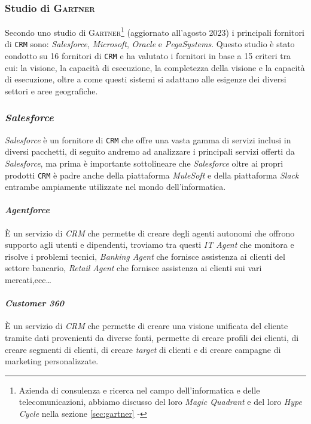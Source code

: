 {{    \subsubsection{Studio di \textsc{Gartner}}
        Secondo uno studio di \textsc{Gartner}\footnote{
            Azienda di consulenza e ricerca nel campo dell'informatica e delle telecomunicazioni, abbiamo discusso del loro \textit{Magic Quadrant} e del loro \textit{Hype Cycle} nella sezione \ref{sec:gartner} - 
        } (aggiornato all'agosto 2023) i principali fornitori di \texttt{CRM} sono: \textit{Salesforce}, \textit{Microsoft}, \textit{Oracle} e \textit{PegaSystems}. Questo studio è stato condotto su 16 fornitori di \texttt{CRM} e ha valutato i fornitori in base a 15 criteri tra cui: la visione, la capacità di esecuzione, la completezza della visione e la capacità di esecuzione, oltre a come questi sistemi si adattano alle esigenze dei diversi settori e aree geografiche.
    \subsubsection{\textit{Salesforce}}
        \textit{Salesforce} è un fornitore di \texttt{CRM} che offre una vasta gamma di servizi inclusi in diversi pacchetti, di seguito andremo ad analizzare i principali servizi offerti da \textit{Salesforce}, ma prima è importante sottolineare che \textit{Salesforce} oltre ai propri prodotti \texttt{CRM} è padre anche della piattaforma \textit{MuleSoft} e della piattaforma \textit{Slack} entrambe ampiamente utilizzate nel mondo dell'informatica.
        \paragraph{\textit{Agentforce}} È un servizio di \textit{CRM} che permette di creare degli agenti autonomi che offrono supporto agli utenti e dipendenti, troviamo tra questi \textit{IT Agent} che monitora e risolve i problemi tecnici, \textit{Banking Agent} che fornisce assistenza ai clienti del settore bancario, \textit{Retail Agent} che fornisce assistenza ai clienti sui vari mercati,ecc\dots
        \paragraph{\textit{Customer 360}} È un servizio di \textit{CRM} che permette di creare una visione unificata del cliente tramite dati provenienti da diverse fonti, permette di creare profili dei clienti, di creare segmenti di clienti, di creare \textit{target} di clienti e di creare campagne di marketing personalizzate.
}}

